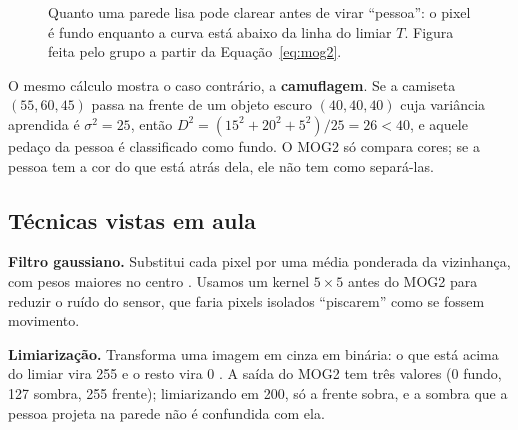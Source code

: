 \begin{figure}[H]
\centering
{}
\caption{Quanto uma parede lisa pode clarear antes de virar ``pessoa'':
o pixel é fundo enquanto a curva está abaixo da linha do limiar $T$.
Figura feita pelo grupo a partir da Equação~\ref{eq:mog2}.}
\label{fig:mog2}
\end{figure}

O mesmo cálculo mostra o caso contrário, a \textbf{camuflagem}. Se a
camiseta $(55, 60, 45)$ passa na frente de um objeto escuro
$(40, 40, 40)$ cuja variância aprendida é $\sigma^2 = 25$, então
$D^2 = (15^2 + 20^2 + 5^2)/25 = 26 < 40$, e aquele pedaço da pessoa é
classificado como fundo. O MOG2 só compara cores; se a pessoa tem a cor
do que está atrás dela, ele não tem como separá-las.

\subsection{Técnicas vistas em aula}
\label{sec:tecnicas}

\textbf{Filtro gaussiano.} Substitui cada pixel por uma média ponderada
da vizinhança, com pesos maiores no centro
\citep{gonzalez2010}. Usamos um kernel $5 \times 5$ antes do MOG2 para
reduzir o ruído do sensor, que faria pixels isolados ``piscarem'' como
se fossem movimento.

\textbf{Limiarização.} Transforma uma imagem em cinza em binária: o que
está acima do limiar vira 255 e o resto vira 0 \citep{gonzalez2010}. A
saída do MOG2 tem três valores (0 fundo, 127 sombra, 255 frente);
limiarizando em 200, só a frente sobra, e a sombra que a pessoa projeta
na parede não é confundida com ela.

